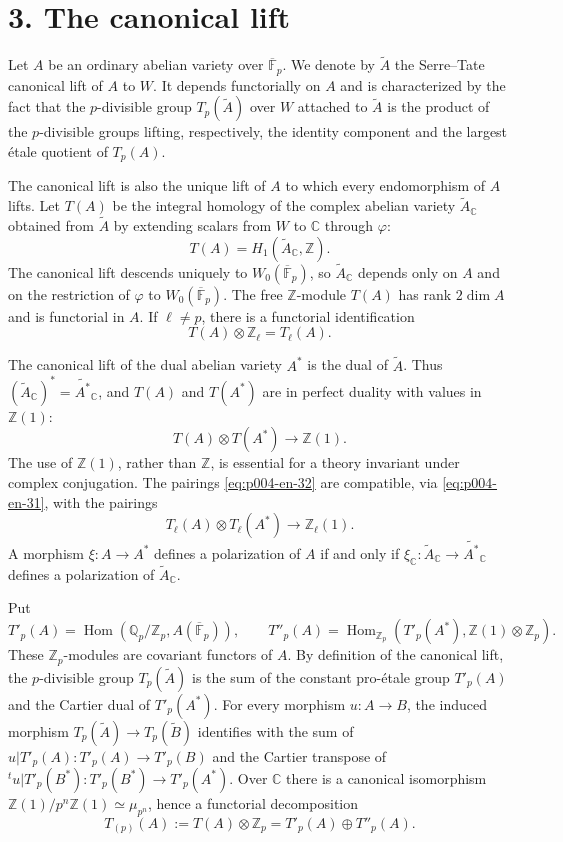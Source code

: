 \documentclass[12pt]{article}
\DeclareMathOperator{\Hom}{Hom}
\newcommand{\Z}{\mathbb{Z}}
\newcommand{\Q}{\mathbb{Q}}
\newcommand{\C}{\mathbb{C}}
\newcommand{\F}{\mathbb{F}}
\theoremstyle{plain}
\theoremstyle{definition}
\theoremstyle{remark}
\begin{document}
\section*{3. The canonical lift}
Let $A$ be an ordinary abelian variety over $\overline{\F}_p$. We denote by $\widetilde A$ the Serre--Tate canonical lift of $A$ to $W$. It depends functorially on $A$ and is characterized by the fact that the $p$-divisible group $T_p(\widetilde A)$ over $W$ attached to $\widetilde A$ is the product of the $p$-divisible groups lifting, respectively, the identity component and the largest étale quotient of $T_p(A)$.

The canonical lift is also the unique lift of $A$ to which every endomorphism of $A$ lifts. Let $T(A)$ be the integral homology of the complex abelian variety $\widetilde A_\C$ obtained from $\widetilde A$ by extending scalars from $W$ to $\C$ through $\varphi$:
\[
 T(A)=H_1(\widetilde A_\C,\Z).
\]
The canonical lift descends uniquely to $W_0(\overline{\F}_p)$, so $\widetilde A_\C$ depends only on $A$ and on the restriction of $\varphi$ to $W_0(\overline{\F}_p)$. The free $\Z$-module $T(A)$ has rank $2\dim A$ and is functorial in $A$. If $\ell\ne p$, there is a functorial identification
\begin{equation}\label{eq:p004-en-31}
 T(A)\otimes\Z_\ell=T_\ell(A).
\end{equation}

The canonical lift of the dual abelian variety $A^*$ is the dual of $\widetilde A$. Thus $(\widetilde A_\C)^*=\widetilde{A^*}_\C$, and $T(A)$ and $T(A^*)$ are in perfect duality with values in $\Z(1)$:
\begin{equation}\label{eq:p004-en-32}
 T(A)\otimes T(A^*)\longrightarrow \Z(1).
\end{equation}
The use of $\Z(1)$, rather than $\Z$, is essential for a theory invariant under complex conjugation. The pairings \eqref{eq:p004-en-32} are compatible, via \eqref{eq:p004-en-31}, with the pairings
\[
 T_\ell(A)\otimes T_\ell(A^*)\longrightarrow\Z_\ell(1).
\]
A morphism $\xi:A\to A^*$ defines a polarization of $A$ if and only if $\xi_\C:\widetilde A_\C\to\widetilde{A^*}_\C$ defines a polarization of $\widetilde A_\C$.

Put
\[
 T'_p(A)=\Hom(\Q_p/\Z_p,A(\overline{\F}_p)),
\qquad
 T''_p(A)=\Hom_{\Z_p}(T'_p(A^*),\Z(1)\otimes\Z_p).
\]
These $\Z_p$-modules are covariant functors of $A$. By definition of the canonical lift, the $p$-divisible group $T_p(\widetilde A)$ is the sum of the constant pro-étale group $T'_p(A)$ and the Cartier dual of $T'_p(A^*)$. For every morphism $u:A\to B$, the induced morphism $T_p(\widetilde A)\to T_p(\widetilde B)$ identifies with the sum of $u|T'_p(A):T'_p(A)\to T'_p(B)$ and the Cartier transpose of ${}^t u|T'_p(B^*):T'_p(B^*)\to T'_p(A^*)$. Over $\C$ there is a canonical isomorphism $\Z(1)/p^n\Z(1)\simeq\mu_{p^n}$, hence a functorial decomposition
\begin{equation}\label{eq:p004-en-pdec}
 T_{(p)}(A):=T(A)\otimes\Z_p=T'_p(A)\oplus T''_p(A).
\end{equation}
\end{document}
